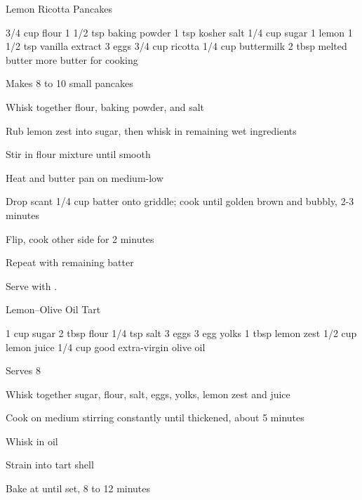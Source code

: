 \begin{denserecipe}{Lemon Ricotta Pancakes}{}
\begin{ingredients}
3/4 cup flour
1 1/2 tsp baking powder
1 tsp kosher salt
1/4 cup sugar
1 lemon
1 1/2 tsp vanilla extract
3 eggs
3/4 cup ricotta
1/4 cup buttermilk
2 tbsp melted butter
more butter for cooking
\end{ingredients}
\nextcolumn
Makes 8 to 10 small pancakes
\begin{steps}
\item Whisk together flour, baking powder, and salt
\item Rub lemon zest into sugar, then whisk in remaining wet ingredients
\item Stir in flour mixture until smooth
\item Heat and butter pan on medium-low
\item Drop scant 1/4 cup batter onto griddle; cook until golden brown and bubbly, 2-3 minutes
\item Flip, cook other side for 2 minutes
\item Repeat with remaining batter
\end{steps}
Serve with .
\end{denserecipe}

\begin{recipe}{Lemon--Olive Oil Tart}{}
\begin{ingredients}
1 cup sugar
2 tbsp flour
1/4 tsp salt
3 eggs
3 egg yolks
1 tbsp lemon zest
1/2 cup lemon juice
1/4 cup good extra-virgin olive oil
\end{ingredients}
\nextcolumn
Serves 8
\begin{steps}
    \item Whisk together sugar, flour, salt, eggs, yolks, lemon zest and juice
    \item Cook on medium stirring constantly until thickened, about 5 minutes
    \item Whisk in oil
    \item Strain into tart shell
    \item Bake at  until set, 8 to 12 minutes
\end{steps}
\end{recipe}

